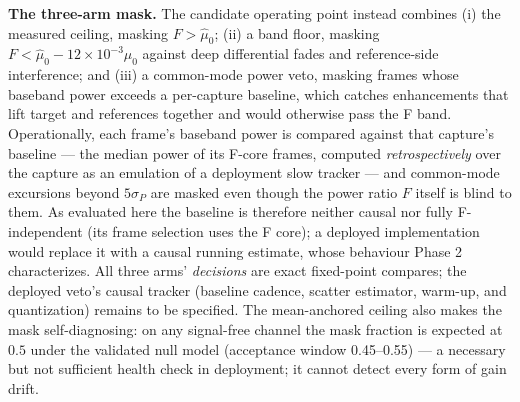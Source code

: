 \textbf{The three-arm mask.} The candidate operating point instead
combines
(i) the measured ceiling, masking $F > \hat\mu_0$; (ii) a band floor,
masking $F < \hat\mu_0 - 12\times10^{-3}\mu_0$ against deep differential
fades and reference-side interference; and (iii) a common-mode power veto,
masking frames whose baseband power exceeds a per-capture baseline, which
catches enhancements that lift target and references together and would
otherwise pass the F band. Operationally, each frame's baseband power is
compared against that capture's baseline --- the median power of its
F-core frames, computed \emph{retrospectively} over the capture as an
emulation of a deployment slow tracker --- and common-mode excursions
beyond $5\sigma_P$ are masked even though the power ratio $F$ itself is
blind to them. As evaluated here the baseline is therefore neither
causal nor fully F-independent (its frame selection uses the F core); a
deployed implementation would replace it with a causal running
estimate, whose behaviour Phase 2 characterizes. All three arms' \emph{decisions} are exact fixed-point compares; the
deployed veto's causal tracker (baseline cadence, scatter estimator,
warm-up, and quantization) remains to be specified.
The mean-anchored ceiling also makes the mask self-diagnosing: on any
signal-free channel the mask fraction is expected at $0.5$ under the
validated null model (acceptance window 0.45--0.55) --- a necessary but
not sufficient health check in deployment; it cannot detect every form of
gain drift.

